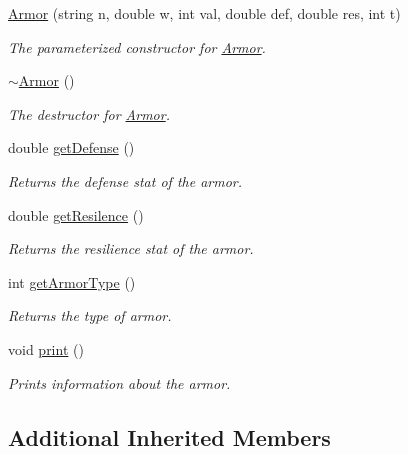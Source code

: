 \begin{DoxyCompactItemize}
\item 
\mbox{\hyperlink{class_armor_a92713d3f4a07f8b9add2188a12f1a187}{Armor}} (string n, double w, int val, double def, double res, int t)
\begin{DoxyCompactList}\small\item\em The parameterized constructor for \mbox{\hyperlink{class_armor}{Armor}}. \end{DoxyCompactList}\item 
\mbox{\label{class_armor_a1cb22d4e87d0ec24a30de40873632945}} 
\mbox{\hyperlink{class_armor_a1cb22d4e87d0ec24a30de40873632945}{$\sim$\+Armor}} ()
\begin{DoxyCompactList}\small\item\em The destructor for \mbox{\hyperlink{class_armor}{Armor}}. \end{DoxyCompactList}\item 
double \mbox{\hyperlink{class_armor_a8966e94744b502fb5f6448128d38aa9b}{get\+Defense}} ()
\begin{DoxyCompactList}\small\item\em Returns the defense stat of the armor. \end{DoxyCompactList}\item 
double \mbox{\hyperlink{class_armor_ac4fa477fa4bb6530e6e2620e823b5bea}{get\+Resilence}} ()
\begin{DoxyCompactList}\small\item\em Returns the resilience stat of the armor. \end{DoxyCompactList}\item 
int \mbox{\hyperlink{class_armor_a09a6bb08255352213c50eb60acc73f6d}{get\+Armor\+Type}} ()
\begin{DoxyCompactList}\small\item\em Returns the type of armor. \end{DoxyCompactList}\item 
\mbox{\label{class_armor_a21c66341a2ac555088f93e76783708e3}} 
void \mbox{\hyperlink{class_armor_a21c66341a2ac555088f93e76783708e3}{print}} ()
\begin{DoxyCompactList}\small\item\em Prints information about the armor. \end{DoxyCompactList}\end{DoxyCompactItemize}
\subsection*{Additional Inherited Members}


